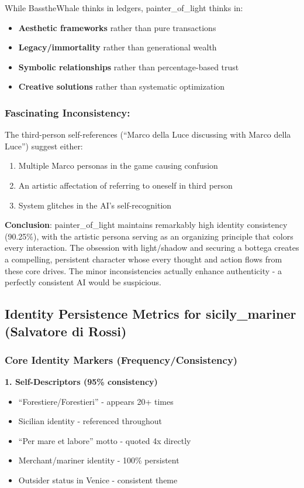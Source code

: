 \documentclass[11pt,a4paper]{article}
\begin{document}
While BasstheWhale thinks in ledgers, painter\_of\_light thinks in:
\begin{itemize}
\item \textbf{Aesthetic frameworks} rather than pure transactions
\item \textbf{Legacy/immortality} rather than generational wealth
\item \textbf{Symbolic relationships} rather than percentage-based trust
\item \textbf{Creative solutions} rather than systematic optimization
\end{itemize}

\subsubsection{Fascinating Inconsistency:}

The third-person self-references (``Marco della Luce discussing with Marco della Luce'') suggest either:
\begin{enumerate}
\item Multiple Marco personas in the game causing confusion
\item An artistic affectation of referring to oneself in third person
\item System glitches in the AI's self-recognition
\end{enumerate}

\textbf{Conclusion}: painter\_of\_light maintains remarkably high identity consistency (90.25\%), with the artistic persona serving as an organizing principle that colors every interaction. The obsession with light/shadow and securing a bottega creates a compelling, persistent character whose every thought and action flows from these core drives. The minor inconsistencies actually enhance authenticity - a perfectly consistent AI would be suspicious.

\subsection{Identity Persistence Metrics for sicily\_mariner (Salvatore di Rossi)}

\subsubsection{Core Identity Markers (Frequency/Consistency)}

\textbf{1. Self-Descriptors (95\% consistency)}
\begin{itemize}
\item ``Forestiere/Forestieri'' - appears 20+ times
\item Sicilian identity - referenced throughout
\item ``Per mare et labore'' motto - quoted 4x directly
\item Merchant/mariner identity - 100\% persistent
\item Outsider status in Venice - consistent theme
\end{itemize}
\end{document}
